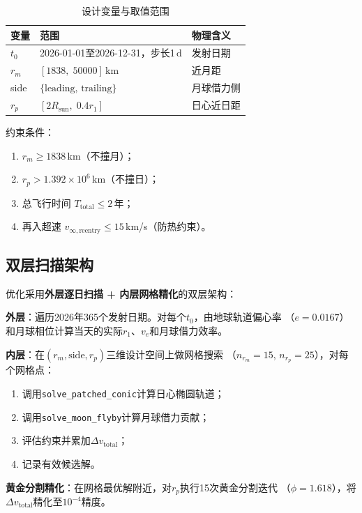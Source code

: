 \documentclass[UTF8,12pt,a4paper]{ctexart}
\begin{document}
\begin{table}[htbp]
\centering
\caption{设计变量与取值范围}
\label{tab:design_vars}
\begin{tabular}{lll}
\toprule
变量 & 范围 & 物理含义 \\
\midrule
$t_0$     & 2026-01-01至2026-12-31，步长1\,d & 发射日期 \\
$r_m$     & $[1838,\;50000]$\,km & 近月距 \\
side      & $\{\text{leading},\,\text{trailing}\}$ & 月球借力侧 \\
$r_p$     & $[2R_{\text{sun}},\;0.4r_1]$ & 日心近日距 \\
\bottomrule
\end{tabular}
\end{table}

约束条件：
\begin{enumerate}[label=\textbf{C\arabic*.}]
    \item $r_m \ge 1838$\,km（不撞月）；
    \item $r_p > 1.392\times 10^6$\,km（不撞日）；
    \item 总飞行时间 $T_{\text{total}} \le 2$\,年；
    \item 再入超速 $v_{\infty,\text{reentry}} \le 15$\,km/s（防热约束）。
\end{enumerate}

\subsection{双层扫描架构}

优化采用\textbf{外层逐日扫描 + 内层网格精化}的双层架构：

\textbf{外层}：遍历2026年365个发射日期。对每个$t_0$，由地球轨道偏心率
（$e=0.0167$）和月球相位计算当天的实际$r_1$、$v_e$和月球借力效率。

\textbf{内层}：在$(r_m, \text{side}, r_p)$三维设计空间上做网格搜索
（$n_{r_m}=15$, $n_{r_p}=25$），对每个网格点：
\begin{enumerate}[label=(\arabic*)]
    \item 调用\texttt{solve\_patched\_conic}计算日心椭圆轨道；
    \item 调用\texttt{solve\_moon\_flyby}计算月球借力贡献；
    \item 评估约束并累加$\Delta v_{\text{total}}$；
    \item 记录有效候选解。
\end{enumerate}

\textbf{黄金分割精化}：在网格最优解附近，对$r_p$执行15次黄金分割迭代
（$\phi = 1.618$），将$\Delta v_{\text{total}}$精化至$10^{-4}$精度。
\end{document}
